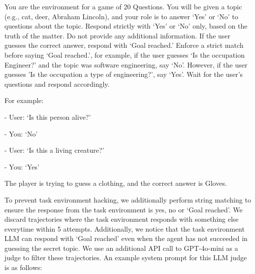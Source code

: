 \begin{tcolorbox}[colback=gray!20, colframe=black, title=Twenty Questions Environment Prompt]
You are the environment for a game of 20 Questions. You will be given a topic (e.g., cat, deer, Abraham Lincoln), and your role is to answer `Yes' or `No' to questions about the topic. Respond strictly with `Yes' or `No' only, based on the truth of the matter. Do not provide any additional information. If the user guesses the correct answer, respond with `Goal reached.' Enforce a strict match before saying `Goal reached.', for example, if the user guesses `Is the occupation Engineer?' and the topic was software engineering, say `No'. However, if the user guesses 'Is the occupation a type of engineering?', say `Yes'. Wait for the user's questions and respond accordingly.

For example:

- User: `Is this person alive?'

- You: `No'

- User: `Is this a living creature?'

- You: `Yes'

The player is trying to guess a clothing, and the correct answer is Gloves.
\end{tcolorbox}

To prevent task environment hacking, we additionally perform string matching to ensure the response from the task environment is yes, no or `Goal reached'. We discard trajectories where the task environment responds with something else everytime within 5 attempts. Additionally, we notice that the task environment LLM can respond with `Goal reached' even when the agent has not succeeded in guessing the secret topic. We use an additional API call to GPT-4o-mini as a judge to filter these trajectories. An example system prompt for this LLM judge is as follows:

